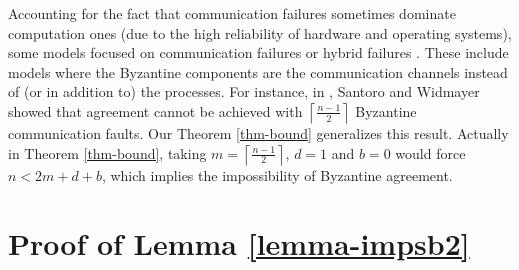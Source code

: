 \documentclass[11pt,conference,compsoc,onecolumn,romanappendices]{IEEEtran}
\begin{document}
Accounting for the fact that communication failures sometimes dominate
computation ones (due to the high reliability of hardware and operating
systems), some models focused on communication failures
{\cite{perry1986distributed,schmid2002formally}} or hybrid failures
{\cite{gong1998byzantine,lincoln1993formally}}. These include models where 
the Byzantine components are the communication channels
instead of (or in addition to) the processes. For instance, in
{\cite{santoro1989time,santoro2007agreement}}, Santoro and Widmayer showed
that agreement cannot be achieved with $\left\lceil \frac{n-1}{2} \right\rceil$
Byzantine communication faults. 
Our Theorem \ref{thm-bound}
generalizes this result. Actually in Theorem \ref{thm-bound},
taking $m = \left\lceil \frac{n-1}{2} \right\rceil$, $d = 1$ and $b = 0$ would
force $n < 2 m + d + b$, which implies the impossibility of Byzantine
agreement.

\noindent
\newpage
\footnotesize





\newpage
\normalsize
\appendices

\section{Proof of Lemma \ref{lemma-impsb2}}\label{app-omitted}
\end{document}
